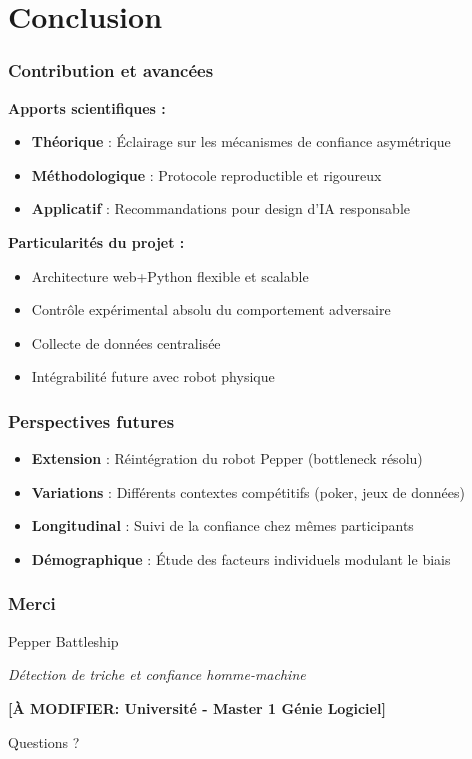 \documentclass[11pt, french]{beamer}
\newcommand{\todo}[1]{{\color{red}\textbf{[À MODIFIER: #1]}}}
\begin{document}

\section{Conclusion}

\begin{frame}
\frametitle{Contribution et avancées}
\textbf{Apports scientifiques :}
\begin{itemize}
    \item \textbf{Théorique} : Éclairage sur les mécanismes de confiance asymétrique
    \item \textbf{Méthodologique} : Protocole reproductible et rigoureux
    \item \textbf{Applicatif} : Recommandations pour design d'IA responsable
\end{itemize}

\vspace{0.5cm}

\textbf{Particularités du projet :}
\begin{itemize}
    \item Architecture web+Python flexible et scalable
    \item Contrôle expérimental absolu du comportement adversaire
    \item Collecte de données centralisée
    \item Intégrabilité future avec robot physique
\end{itemize}
\end{frame}

\begin{frame}
\frametitle{Perspectives futures}
\begin{itemize}
    \item \textbf{Extension} : Réintégration du robot Pepper (bottleneck résolu)
    \item \textbf{Variations} : Différents contextes compétitifs (poker, jeux de données)
    \item \textbf{Longitudinal} : Suivi de la confiance chez mêmes participants
    \item \textbf{Démographique} : Étude des facteurs individuels modulant le biais
\end{itemize}
\end{frame}

\begin{frame}
\frametitle{Merci}
\begin{center}
{\Large Pepper Battleship}

\vspace{1cm}

\textit{Détection de triche et confiance homme-machine}

\vspace{2cm}

\todo{Université - Master 1 Génie Logiciel}

\vspace{1cm}

Questions ?
\end{center}
\end{frame}
\end{document}
